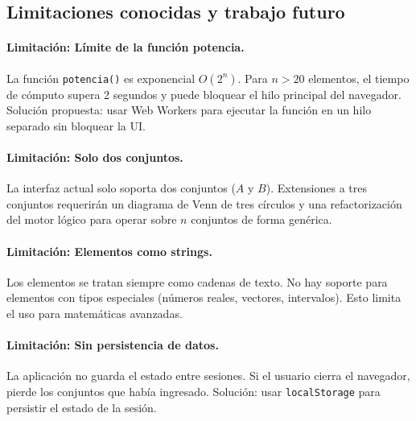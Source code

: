 \documentclass[11pt,a4paper]{article}
\begin{document}
\subsection{Limitaciones conocidas y trabajo futuro}
\paragraph{Limitación: Límite de la función potencia.}
La función \texttt{potencia()} es exponencial $O(2^n)$. Para $n > 20$ elementos, el tiempo de cómputo supera 2 segundos y puede bloquear el hilo principal del navegador. Solución propuesta: usar Web Workers para ejecutar la función en un hilo separado sin bloquear la UI.

\paragraph{Limitación: Solo dos conjuntos.}
La interfaz actual solo soporta dos conjuntos ($A$ y $B$). Extensiones a tres conjuntos requerirán un diagrama de Venn de tres círculos y una refactorización del motor lógico para operar sobre $n$ conjuntos de forma genérica.

\paragraph{Limitación: Elementos como strings.}
Los elementos se tratan siempre como cadenas de texto. No hay soporte para elementos con tipos especiales (números reales, vectores, intervalos). Esto limita el uso para matemáticas avanzadas.

\paragraph{Limitación: Sin persistencia de datos.}
La aplicación no guarda el estado entre sesiones. Si el usuario cierra el navegador, pierde los conjuntos que había ingresado. Solución: usar \texttt{localStorage} para persistir el estado de la sesión.
\end{document}
